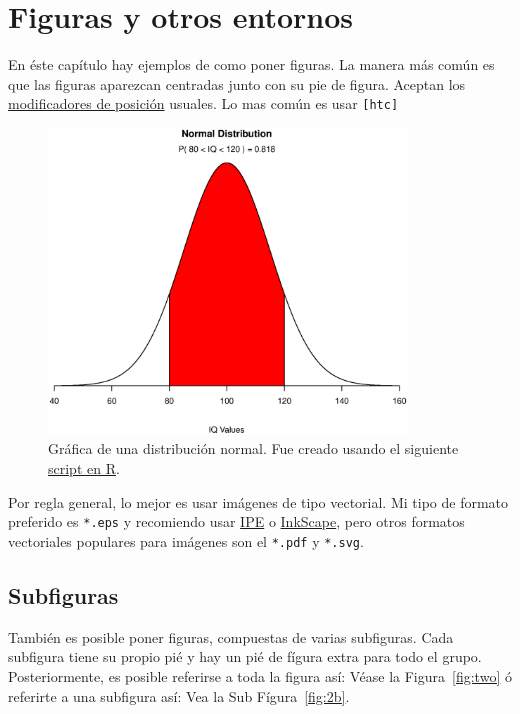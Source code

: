 \section{Figuras y otros entornos}
\label{sec:figuras}
En éste capítulo hay ejemplos de como poner figuras.
La manera más común es que las figuras aparezcan centradas junto con su pie de figura.
Aceptan los \href{https://en.wikibooks.org/wiki/LaTeX/Floats,_Figures_and_Captions#Figures}{modificadores de posición} usuales.
Lo mas común es usar \texttt{[htc]}
 
\begin{figure}[htb]
  \centering
  \label{fig:normalDist}
  \includegraphics[width=0.85\textwidth]{img/02/normal}
  \caption[Distribución normal]{Gráfica de una distribución normal. Fue creado usando el siguiente \href{https://www.statmethods.net/advgraphs/probability.html}{script en R}.}
\end{figure}

Por regla general, lo mejor es usar imágenes de tipo vectorial.
Mi tipo de formato preferido es \verb|*.eps| y recomiendo usar \href{https://ipe.otfried.org/}{IPE} o \href{https://inkscape.org/}{InkScape}, pero otros formatos vectoriales populares para imágenes son el \verb|*.pdf| y \verb|*.svg|.

\subsection{Subfiguras}

También es posible poner figuras, compuestas de varias subfiguras.
Cada subfigura tiene su propio pié y hay un pié de fígura extra para todo el grupo.
Posteriormente, es posible referirse a toda la figura así: Véase la  Figura~\ref{fig:two} ó referirte a una subfigura así:
Vea la Sub Fígura~\ref{fig:2b}.

